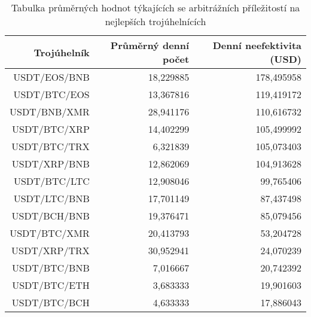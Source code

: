 \begin{table}\centering
\caption{Tabulka průměrných hodnot týkajících se arbitrážních příležitostí na nejlepších trojúhelnících}
\label{table_combined_best}
\begin{tabular}{|| r | r | r ||}\hline Trojúhelník & Průměrný denní počet & Denní neefektivita (USD)\\ [0.5ex]
 \hline\hline USDT/EOS/BNB & 18,229885 & 178,495958\\ 
 \hline USDT/BTC/EOS & 13,367816 & 119,419172\\ 
 \hline USDT/BNB/XMR & 28,941176 & 110,616732\\ 
 \hline USDT/BTC/XRP & 14,402299 & 105,499992\\ 
 \hline USDT/BTC/TRX & 6,321839 & 105,073403\\ 
 \hline USDT/XRP/BNB & 12,862069 & 104,913628\\ 
 \hline USDT/BTC/LTC & 12,908046 & 99,765406\\ 
 \hline USDT/LTC/BNB & 17,701149 & 87,437498\\ 
 \hline USDT/BCH/BNB & 19,376471 & 85,079456\\ 
 \hline USDT/BTC/XMR & 20,413793 & 53,204728\\ 
 \hline USDT/XRP/TRX & 30,952941 & 24,070239\\ 
 \hline USDT/BTC/BNB & 7,016667 & 20,742392\\ 
 \hline USDT/BTC/ETH & 3,683333 & 19,901603\\ 
 \hline USDT/BTC/BCH & 4,633333 & 17,886043\\ 
 \hline
\end{tabular}
\end{table}